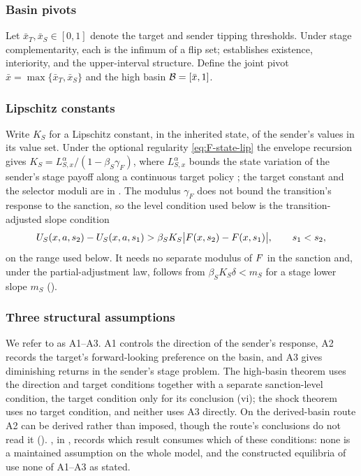 \subsubsection*{Basin pivots}

Let $\bar x_T,\bar x_S\in[0,1]$ denote the target and sender tipping
thresholds. Under stage complementarity, each is the infimum of a flip
set;  establishes existence, interiority, and the
upper-interval structure. Define the joint pivot
$\bar x=\max\{\bar x_T,\bar x_S\}$ and the high basin
$\mathcal{B}=[\bar x,1]$.

\subsubsection*{Lipschitz constants}

Write $K_S$ for a Lipschitz constant, in the inherited state, of the
sender's values in its value set. Under the optional regularity \eqref{eq:F-state-lip} the
envelope recursion gives $K_S=L_{S,x}^{\alpha}/(1-\beta_S\gamma_F)$, where
$L_{S,x}^{\alpha}$ bounds the state variation of the sender's stage payoff along
a continuous target policy \citep{StokeyLucas1989,BertsekasTsitsiklis1996};
the target constant and the selector moduli are in .
The modulus $\gamma_F$ does not bound the transition's response to the
sanction, so the level condition used below is the transition-adjusted slope condition
\begin{equation}
U_S(x,a,s_2)-U_S(x,a,s_1)
>
\beta_S K_S\bigl|F(x,s_2)-F(x,s_1)\bigr|,
\qquad s_1<s_2,
\label{eq:F-adjusted-sender-chord}
\end{equation}
on the range used below. It needs no separate modulus of $F$ in the sanction
and, under the partial-adjustment law, follows from $\beta_SK_S\delta<m_S$ for a stage
lower slope $m_S$ ().

\subsubsection*{Three structural assumptions}

We refer to  as A1--A3. A1
controls the direction of the sender's response, A2 records the
target's forward-looking preference on the basin, and A3 gives
diminishing returns in the sender's stage problem. The high-basin
theorem uses the direction and target conditions together with a separate
sanction-level condition, the target condition only for its conclusion (vi);
the shock theorem uses no target condition, and neither uses A3 directly.
On the derived-basin route A2 can be derived rather than imposed, though the
route's conclusions do not read it (). , in ,
records which
result consumes which of these conditions: none is a maintained assumption
on the whole model, and the constructed equilibria of 
use none of A1--A3 as stated.


